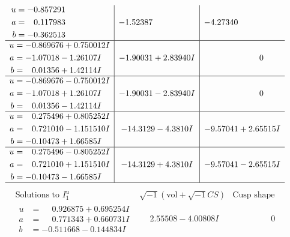 \documentclass[1p]{elsarticle_modified}
\theoremstyle{definition}
\newcommand{\I}{\sqrt{-1}}
\begin{document}
$$\begin{array}{c|c|c}
\begin{aligned}
u &= -0.857291\phantom{ +0.000000I} \\
a &= \phantom{-}0.117983\phantom{ +0.000000I} \\
b &= -0.362513\phantom{ +0.000000I}\end{aligned}
 & -1.52387\phantom{ +0.000000I} & -4.27340\phantom{ +0.000000I} \\ \hline\begin{aligned}
u &= -0.869676 + 0.750012 I \\
a &= -1.07018 - 1.26107 I \\
b &= \phantom{-}0.01356 + 1.42114 I\end{aligned}
 & -1.90031 + 2.83940 I & \phantom{-0.000000 } 0 \\ \hline\begin{aligned}
u &= -0.869676 - 0.750012 I \\
a &= -1.07018 + 1.26107 I \\
b &= \phantom{-}0.01356 - 1.42114 I\end{aligned}
 & -1.90031 - 2.83940 I & \phantom{-0.000000 } 0 \\ \hline\begin{aligned}
u &= \phantom{-}0.275496 + 0.805252 I \\
a &= \phantom{-}0.721010 - 1.151510 I \\
b &= -0.10473 + 1.66585 I\end{aligned}
 & -14.3129 - 4.3810 I & -9.57041 + 2.65515 I \\ \hline\begin{aligned}
u &= \phantom{-}0.275496 - 0.805252 I \\
a &= \phantom{-}0.721010 + 1.151510 I \\
b &= -0.10473 - 1.66585 I\end{aligned}
 & -14.3129 + 4.3810 I & -9.57041 - 2.65515 I\\
 \hline 
 \end{array}$$\newpage$$\begin{array}{c|c|c}  
\text{Solutions to }I^u_{1}& \I (\text{vol} + \sqrt{-1}CS) & \text{Cusp shape}\\
 \hline 
\begin{aligned}
u &= \phantom{-}0.926875 + 0.695254 I \\
a &= \phantom{-}0.771343 + 0.660731 I \\
b &= -0.511668 - 0.144834 I\end{aligned}
 & \phantom{-}2.55508 - 4.00808 I & \phantom{-0.000000 } 0 \\ \hline\begin{aligned}

\end{aligned}
\end{array}$$
\end{document}
